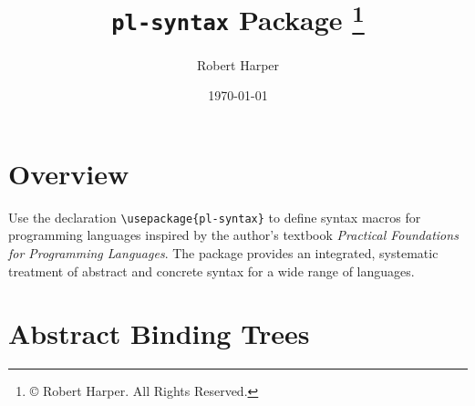 \documentclass[11pt]{article}
\title{\texttt{pl-syntax} Package%
\footnote{\copyright{} \the\year{} Robert Harper.  All Rights Reserved.}}
\author{Robert Harper}
\date{\today}
\begin{document}
\maketitle{}

\section*{Overview\footnotemark}


Use the declaration \verb|\usepackage{pl-syntax}| to define syntax macros for programming languages inspired by the author's textbook \textit{Practical Foundations for Programming Languages}. The package provides an integrated, systematic treatment of abstract and concrete syntax for a wide range of languages.

\section*{Abstract Binding Trees}
\end{document}
